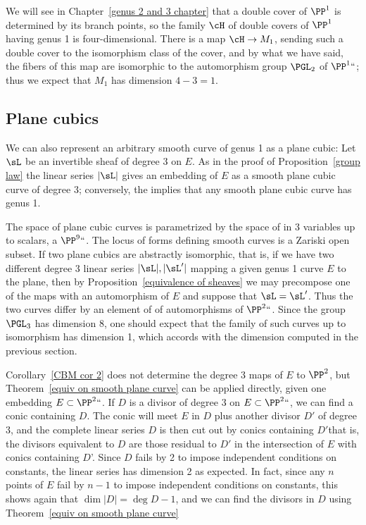 
We will see in Chapter~\ref{genus 2 and 3 chapter} that a double cover
of $\PP^1$ is determined by  its branch points, so the family $\cH$ of
double covers of $\PP^1$ having genus 1 is four-dimensional. There is
a map $\cH \to M_1$, sending such a double cover to the isomorphism
class of the cover, and by what we have said, the fibers of this map
%
%
are isomorphic to the automorphism group $\PGL_2$ of $\PP^1` `$; thus
we expect that $M_1$ has dimension $4-3=1$.

\subsection*{Plane cubics}

We can also represent an arbitrary smooth curve of genus 1 as a plane cubic:
%
Let $\sL$ be an invertible sheaf of degree 3 on $E$. As in the proof
of Proposition~\ref{group law} the linear series $|\sL|$ gives an
embedding of $E$ as a smooth plane cubic curve of degree 3;
conversely, the 
%
implies that any smooth plane cubic curve has genus 1.

The space of plane cubic curves is parametrized by the space of 
%
in 3 variables up to 
scalars, a  $\PP^9` `$. The locus of forms defining smooth curves is a Zariski open subset. If two plane cubics are abstractly
isomorphic, that is, if we have two different degree 3 linear series 
$|\sL|, |\sL'|$ mapping a given genus 1 curve $E$ to the plane, then by
Proposition~\ref{equivalence of sheaves} we may  precompose one of the maps with an automorphism of $E$
and suppose that $\sL = \sL'$. Thus the two curves differ by an
element of 
%
of automorphisms of $\PP^2` `$. Since the group
$\PGL_3$ has dimension 8, one should expect that the family of such
curves up to isomorphism has dimension 1, which accords with the
dimension computed in the previous section.

Corollary~\ref{CBM cor 2} does not determine the degree 3 maps of $E$ to $\PP^{2}$, but Theorem~\ref{equiv on smooth plane curve} can be applied directly, given one embedding $E\subset \PP^2` `$. If $D$ is a divisor of degree 3 on $E\subset \PP^2` `$, we can
find a conic containing $D$. The conic will meet $E$ in $D$ plus another divisor $D'$ of degree 3, and the complete linear series
$D$ is then cut out by conics containing $D'$\emdash  that is, the divisors equivalent to $D$ are those residual to $D'$ in the intersection
of $E$ with conics containing $D$'. Since $D$ fails by 2 to impose independent conditions on constants, the linear series has dimension 2 as expected. In fact, since any $n$ points of $E$ fail by $n-1$ to impose independent conditions on constants, this shows again
that $\dim |D| = \deg D -1$, and we can find the divisors in $D$ using Theorem~\ref{equiv on smooth plane curve}

